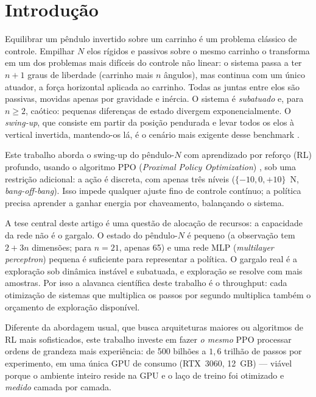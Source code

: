 \documentclass[12pt]{article}
\begin{document}
\section{Introdução}\label{sec:intro}

Equilibrar um pêndulo invertido sobre um carrinho é um problema clássico de
controle. Empilhar $N$ elos rígidos e passivos sobre o mesmo carrinho o
transforma em um dos problemas mais difíceis do controle não linear: o sistema
passa a ter $n+1$ graus de liberdade (carrinho mais $n$ ângulos), mas continua
com um único atuador, a força horizontal aplicada ao carrinho. Todas as juntas
entre elos são passivas, movidas apenas por gravidade e inércia. O sistema é
\emph{subatuado} e, para $n \geq 2$, caótico: pequenas diferenças de estado
divergem exponencialmente. O \emph{swing-up}, que consiste em partir da posição
pendurada e levar todos os elos à vertical invertida, mantendo-os lá, é o
cenário mais exigente desse benchmark \cite{boubaker2013}.

Este trabalho aborda o swing-up do pêndulo-$N$ com aprendizado por reforço
(RL) profundo, usando o algoritmo PPO (\emph{Proximal Policy Optimization})
\cite{schulman2017}, sob uma restrição adicional: a ação é discreta, com apenas três
níveis ($\{-10, 0, +10\}$~N, \emph{bang-off-bang}). Isso impede qualquer ajuste
fino de controle contínuo; a política precisa aprender a ganhar energia por
chaveamento, balançando o sistema.

A tese central deste artigo é uma questão de alocação de recursos: a capacidade
da rede não é o gargalo. O estado do pêndulo-$N$ é pequeno (a observação tem
$2+3n$ dimensões; para $n{=}21$, apenas 65) e uma rede MLP
(\emph{multilayer perceptron}) pequena é suficiente para
representar a política. O gargalo real é a exploração sob dinâmica instável e
subatuada, e exploração se resolve com mais amostras. Por isso a alavanca
científica deste trabalho é o throughput: cada otimização de sistemas que
multiplica os passos por segundo multiplica também o orçamento de exploração
disponível.

Diferente da abordagem usual, que busca arquiteturas maiores ou algoritmos de
RL mais sofisticados, este trabalho investe em fazer \emph{o mesmo} PPO
processar ordens de grandeza mais experiência: de 500 bilhões a $1{,}6$
trilhão de passos por experimento, em uma única GPU de consumo (RTX~3060,
12~GB) --- viável porque o ambiente inteiro reside na GPU e o laço de treino
foi otimizado e \emph{medido} camada por camada.
\end{document}
